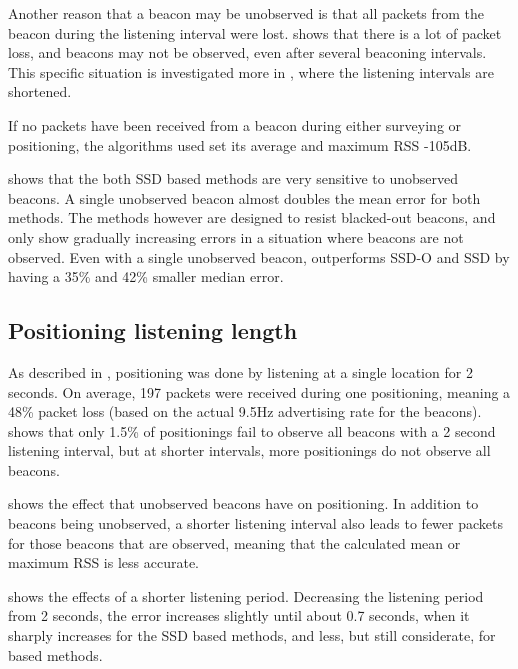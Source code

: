 Another reason that a beacon may be unobserved is that all packets from the beacon during the listening interval were lost.
 shows that there is a lot of packet loss, and beacons may not be observed, even after several beaconing intervals.
This specific situation is investigated more in , where the listening intervals are shortened.

If no packets have been received from a beacon during either surveying or positioning, the algorithms used set its average and maximum RSS -105dB.

 shows that the both SSD based methods are very sensitive to unobserved beacons.
A single unobserved beacon almost doubles the mean error for both methods.
The \aBRP methods however are designed to resist blacked-out beacons, and only show gradually increasing errors in a situation where beacons are not observed.
Even with a single unobserved beacon, \aBRP outperforms SSD-O and SSD by having a 35\% and 42\% smaller median error.

\subsection{Positioning listening length}
\label{sec:architecture-short-walk}
As described in , positioning was done by listening at a single location for 2 seconds.
On average, 197 packets were received during one positioning, meaning a 48\% packet loss (based on the actual 9.5Hz advertising rate for the beacons).
 shows that only 1.5\% of positionings fail to observe all beacons with a 2 second listening interval, but at shorter intervals, more positionings do not observe all beacons.

 shows the effect that unobserved beacons have on positioning.
In addition to beacons being unobserved, a shorter listening interval also leads to fewer packets for those beacons that are observed, meaning that the calculated mean or maximum RSS is less accurate.

 shows the effects of a shorter listening period.
Decreasing the listening period from 2 seconds, the error increases slightly until about 0.7 seconds, when it sharply increases for the SSD based methods, and less, but still considerate, for \aBRP based methods.

